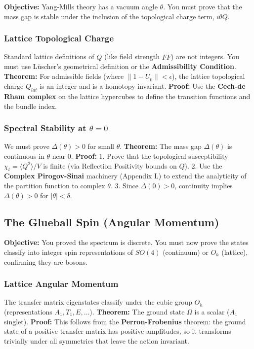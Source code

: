 \textbf{Objective:} Yang-Mills theory has a vacuum angle $\theta$. You must prove that the mass gap is stable under the inclusion of the topological charge term, $i \theta Q$.

\subsubsection{Lattice Topological Charge}
Standard lattice definitions of $Q$ (like field strength $F \tilde{F}$) are not integers. You must use Lüscher's geometrical definition or the \textbf{Admissibility Condition}.
\textbf{Theorem:} For admissible fields (where $\|1-U_p\| < \epsilon$), the lattice topological charge $Q_{lat}$ is an integer and is a homotopy invariant.
\textbf{Proof:} Use the \textbf{Cech-de Rham complex} on the lattice hypercubes to define the transition functions and the bundle index.

\subsubsection{Spectral Stability at \texorpdfstring{$\theta=0$}{theta=0}}
We must prove $\Delta(\theta) > 0$ for small $\theta$.
\textbf{Theorem:} The mass gap $\Delta(\theta)$ is continuous in $\theta$ near 0.
\textbf{Proof:}
1. Prove that the topological susceptibility $\chi_t = \langle Q^2 \rangle / V$ is finite (via Reflection Positivity bounds on $Q$).
2. Use the \textbf{Complex Pirogov-Sinai} machinery (Appendix L) to extend the analyticity of the partition function to complex $\theta$.
3. Since $\Delta(0) > 0$, continuity implies $\Delta(\theta) > 0$ for $|\theta| < \delta$.

\subsection{The Glueball Spin (Angular Momentum)}
\label{sec:glueball_spin}

\textbf{Objective:} You proved the spectrum is discrete. You must now prove the states classify into integer spin representations of $SO(4)$ (continuum) or $O_h$ (lattice), confirming they are bosons.

\subsubsection{Lattice Angular Momentum}
The transfer matrix eigenstates classify under the cubic group $O_h$ (representations $A_1, T_1, E, \dots$).
\textbf{Theorem:} The ground state $\Omega$ is a scalar ($A_1$ singlet).
\textbf{Proof:} This follows from the \textbf{Perron-Frobenius} theorem: the ground state of a positive transfer matrix has positive amplitudes, so it transforms trivially under all symmetries that leave the action invariant.

